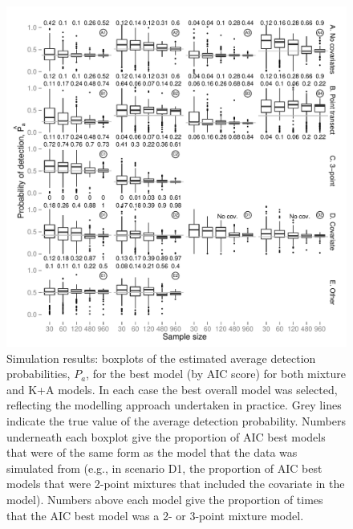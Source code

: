 \documentclass[10pt]{article}
\begin{document}
\begin{figure}[H]
\centering
\includegraphics[width=\textwidth]{simulations/pa-plot-combined.pdf}
\caption{Simulation results: boxplots of the estimated average detection probabilities, $P_a$, for the best model (by AIC score) for both mixture and K+A models. In each case the best overall model was selected, reflecting the modelling approach undertaken in practice. Grey lines indicate the true value of the average detection probability. Numbers underneath each boxplot give the proportion of AIC best models that were of the same form as the model that the data was simulated from (e.g., in scenario D1, the proportion of AIC best models that were 2-point mixtures that included the covariate in the model). Numbers above each model give the proportion of times that the AIC best model was a 2- or 3-point mixture model.}
\label{sim-boxplots-combined}
\end{figure}
\end{document}
